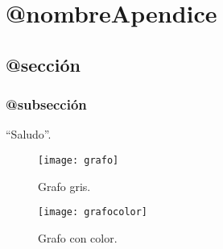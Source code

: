 \chapter{@nombreApendice}
\label{apendiceA}


\section{@sección}
\blindtext

\subsection{@subsección}
\Blindtext

``Saludo''.

\begin{figure}[h!]
\centering
\texttt{[image: grafo]}
\caption[Grafo]{Grafo gris.}
\label{imagen:grafo}
\end{figure}

\begin{figure}[h!]
\centering
\texttt{[image: grafocolor]}
\caption[Grafo coloreado (esto sale en la tabla de contenidos)]{Grafo con color.}
\label{imagen:grafodecolores}
\end{figure}
